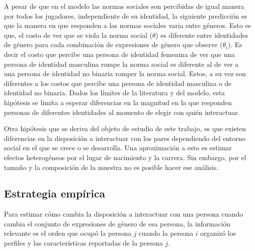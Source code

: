 A pesar de que en el modelo las normas sociales son percibidas de igual manera por todos los jugadores, independiente de su identidad, la siguiente predicción es que la manera en que responden a las normas sociales varia entre géneros. Esto es que, el costo de ver que se viola la norma social ($\theta$) es diferente entre identidades de género para cada combinación de expresiones de género que observe ($\theta_\iota$). Es decir el costo que percibe una persona de identidad femenina de ver que una persona de identidad masculina rompe la norma social es diferente al de ver a una persona de identidad no binaria romper la norma social. Estos, a su vez son diferentes a los costos que percibe una persona de identidad masculina o de identidad no binaria. Dados los límites de la literatura y del modelo, esta hipótesis se limita a esperar diferencias en la magnitud en la que responden personas de diferentes identidades al momento de elegir con quién interactuar. 

Otra hipótesis que se deriva del objeto de estudio de este trabajo, es que existen diferencias en la disposición a interactuar con los pares dependiendo del entorno social en el que se crece o se desarrolla. Una aproximación a esto es estimar efectos heterogéneos por el lugar de nacimiento y la carrera. Sin embargo, por el tamaño y la composición de la muestra no es posible hacer ese análisis. 

\subsection{Estrategia empírica}
Para estimar cómo cambia la disposición a interactuar con una persona cuando cambia el conjunto de expresiones de género de esa persona, la información relevante es el orden que ocupó la persona $j$ cuando la persona $i$ organizó los perfiles y las características reportadas de la persona $j$.

